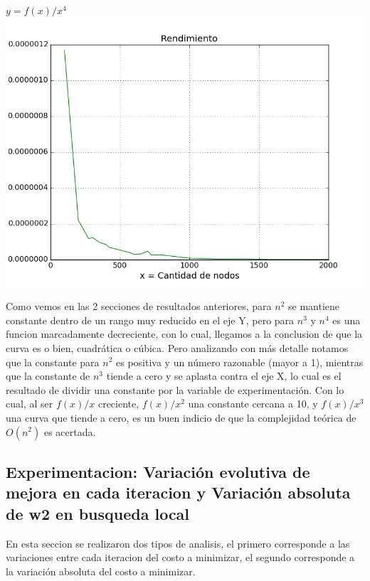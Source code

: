 \begin{center}
	\textbf{$y = f(x)/x^4$}\\
	\includegraphics[scale=0.7]{experimentos/bqlocal/rendimiento_aristas_cuadraticas_3/complexity_med_over_n_fourth.png}
\end{center}

Como vemos en las 2 secciones de resultados anteriores, para $n^2$ se mantiene constante dentro de un rango muy reducido en el eje Y, pero para $n^3$ y $n^4$ es una funcion marcadamente decreciente, con lo cual, llegamos a la conclusion de que la curva es o bien,  cuadr\'atica o c\'ubica. Pero analizando con m\'as detalle notamos que la constante para $n^2$ es positiva y un n\'umero razonable (mayor a 1), mientras que la constante de $n^3$ tiende a cero y se aplasta contra el eje X, lo cual es el resultado de dividir una constante por la variable de experimentaci\'on. Con lo cual, al ser $f(x)/x$ creciente,  $f(x)/x^2$ una constante cercana a 10, y $f(x)/x^3$ una curva que tiende a cero, es un buen indicio de que la complejidad te\'orica de $O(n^2)$ es acertada.

\subsection{Experimentacion: Variaci\'on evolutiva de mejora en cada iteracion y Variaci\'on absoluta de w2 en busqueda local}
En esta seccion se realizaron dos tipos de analisis, el primero corresponde a las variaciones entre cada iteracion del costo a minimizar, el segundo corresponde a la variaci\'on absoluta del costo a minimizar.\\

